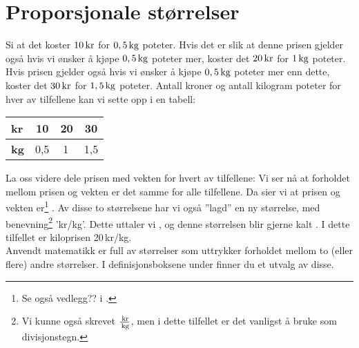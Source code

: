 \section{Proporsjonale størrelser \label{Propstorl}}
Si at det koster $ 10\,\textrm{kr}$ for $ 0,5\,\textrm{kg} $ poteter. Hvis det er slik at denne prisen gjelder også hvis vi ønsker å kjøpe $ 0,5\,\textrm{kg} $ poteter mer, koster det $ 20\,\textrm{kr} $ for $ 1\,\textrm{kg} $ poteter. Hvis prisen gjelder også hvis vi ønsker å kjøpe $ 0,5\,\textrm{kg} $ poteter mer enn dette, koster det $ 30\,\textrm{kr} $ for $ 1,5\,\textrm{kg} $ poteter. Antall kroner og antall kilogram poteter for hver av tilfellene kan vi sette opp i en tabell: \vs
\begin{center}
	\begin{tabular}{|l|c|c|c|}
		\hline
\textbf{kr} & 10  & 20 & 30 \\ \hline
\textbf{kg} & 0,5 & 1\,& 1,5 \\ \hline
	\end{tabular}
\end{center}
La oss videre dele prisen med vekten for hvert av tilfellene:
Vi ser nå at forholdet mellom prisen og vekten er det samme for alle tilfellene. Da sier vi at prisen og vekten er\footnote{Se også vedlegg?? i \mb.} . Av disse to størrelsene har vi også ''lagd'' en ny størrelse, med benevning\footnote{Vi kunne også skrevet $ \frac{\,\textrm{kr}}{\,\textrm{kg}} $, men i dette tilfellet er det vanligst å bruke \sym{/} som divisjonstegn.} 'kr/kg'. Dette uttaler vi , og denne størrelsen blir gjerne kalt . I dette tilfellet er kiloprisen 20\,kr/kg. \\[12pt]

Anvendt matematikk er full av størrelser som uttrykker forholdet mellom to (eller flere) andre størrelser. I definisjonsboksene under finner du et utvalg av disse.\regv

